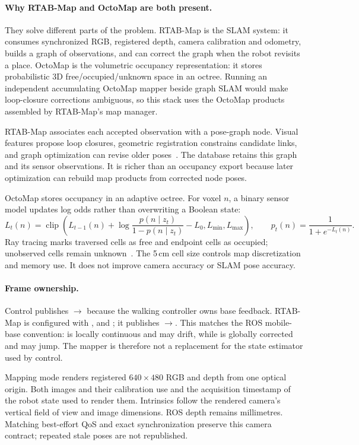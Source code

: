 \documentclass[11pt,a4paper]{article}
\begin{document}
\paragraph{Why RTAB-Map and OctoMap are both present.} They solve different
parts of the problem. RTAB-Map is the SLAM system: it consumes synchronized
RGB, registered depth, camera calibration and odometry, builds a graph of
observations, and can correct the graph when the robot revisits a place.
OctoMap is the volumetric occupancy representation: it stores probabilistic 3D
free/occupied/unknown space in an octree. Running an independent accumulating
OctoMap mapper beside graph SLAM would make loop-closure corrections ambiguous,
so this stack uses the OctoMap products assembled by RTAB-Map's map manager.

RTAB-Map associates each accepted observation with a pose-graph node. Visual
features propose loop closures, geometric registration constrains candidate
links, and graph optimization can revise older poses~\cite{rtabmap-paper}.
The database retains this graph and its sensor observations. It is richer than
an occupancy export because later optimization can rebuild map products from
corrected node poses.

OctoMap stores occupancy in an adaptive octree. For voxel $n$, a binary sensor
model updates log odds rather than overwriting a Boolean state:
\[
 L_t(n)=\operatorname{clip}\!\left(
 L_{t-1}(n)+\log\frac{p(n\mid z_t)}{1-p(n\mid z_t)}-L_0,
 L_{\min},L_{\max}\right),
 \qquad p_t(n)=\frac{1}{1+e^{-L_t(n)}}.
\]
Ray tracing marks traversed cells as free and endpoint cells as occupied;
unobserved cells remain unknown~\cite{octomap}. The 5\,cm cell size controls
map discretization and memory use. It does not improve camera accuracy or SLAM
pose accuracy.

\paragraph{Frame ownership.} Control publishes $\to$
because the walking controller owns base feedback. RTAB-Map is configured with
,  and
; it publishes $\to$. This
matches the ROS mobile-base convention:  is locally continuous and
may drift, while  is globally corrected and may jump. The mapper is
therefore not a replacement for the state estimator used by control.

Mapping mode renders registered $640\times480$ RGB and depth from one optical
origin. Both images and their calibration use
 and the acquisition timestamp of the
robot state used to render them. Intrinsics follow the rendered camera's
vertical field of view and image dimensions. ROS depth remains
 millimetres. Matching best-effort QoS and exact synchronization
preserve this camera contract; repeated stale poses are not republished.
\end{document}
